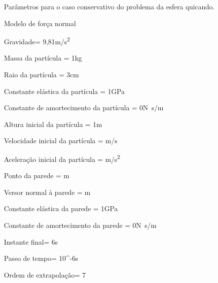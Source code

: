 \begin{table}[h]
\centering
\caption{Parâmetros para o caso conservativo do problema da esfera quicando.}
\label{tab:bouncing_sphere:conservative:parameters}
\begin{parametersdesc}{0.9\textwidth}
	\item{Modelo de força normal}{}{\emptyUnit}
	\item{Gravidade}{\gravityScalar = 9,81}{\si[per-mode=symbol]{\metre\per\square\second}}
	\hline
	\item{Massa da partícula}{\ind{\mass}{\particle} = 1}{\si\kilogram}
	\item{Raio da partícula}{\ind{\radius}{\particle} = 3}{\si\centi\metre}
	\item{Constante elástica da partícula}{\ind{\elasticModulus}{\particle} = 1}{\si[per-mode=symbol]{\giga\pascal}}
	\item{Constante de amortecimento da partícula}{\ind{\normalDampingConstant}{\particle} = \SI{0}{}}{\si[per-mode=symbol]{\newton\second\per\meter}}
	\hline
	\item{Altura inicial da partícula}{\initial{\positiony} = 1}{\si{\metre}}
	\item{Velocidade inicial da partícula}{\explicitVector{\initial{\velocityx}}{\initial{\velocityy}}{\initial{\velocityz}} = }{\si[per-mode=symbol]{\metre\per\second}}
	\item{Aceleração inicial da partícula}{\explicitVector{\initial{\accelerationx}}{\initial{\accelerationy}}{\initial{\accelerationz}} = }{\si[per-mode=symbol]{\metre\per\square\second}}
	\hline
	\item{Ponto da parede}{\ind{\planeOrigin}{\element} = }{\si\meter}
	\item{Versor normal à parede}{\ind{\planeNormalVersor}{\element} = }{\si\metre}
	\item{Constante elástica da parede}{\ind{\elasticModulus}{\element} = 1}{\si[per-mode=symbol]{\giga\pascal}}
	\item{Constante de amortecimento da parede}{\ind{\normalDampingConstant}{\element} = \SI{0}{}}{\si[per-mode=symbol]{\newton\second\per\meter}}
	\hline
	\item{Instante final}{\finalInstant = 6}{\si\second} 
	\item{Passo de tempo}{\Dt = 10^{-6}}{\si\second}
	\item{Ordem de extrapolação}{\taylorOrder = 7}{\emptyUnit}
\end{parametersdesc}
\sourceMe 
\end{table}

